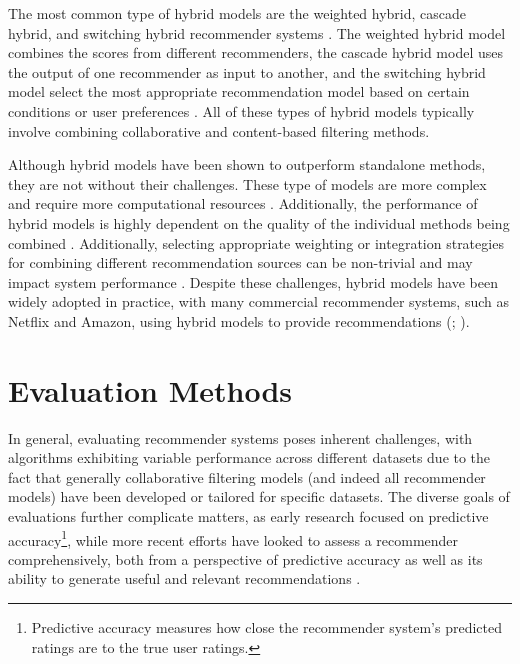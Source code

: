 The most common type of hybrid models are the weighted hybrid, cascade hybrid, and switching hybrid recommender systems \cite{ccano2017hybrid}. The weighted hybrid model combines the scores from different recommenders, the cascade hybrid model uses the output of one recommender as input to another, and the switching hybrid model select the most appropriate recommendation model based on certain conditions or user preferences \cite{ccano2017hybrid}. All of these types of hybrid models typically involve combining collaborative and content-based filtering methods. 

Although hybrid models have been shown to outperform standalone methods, they are not without their challenges. These type of models are more complex and require more computational resources \cite{ccano2017hybrid}. Additionally, the performance of hybrid models is highly dependent on the quality of the individual methods being combined \cite{ccano2017hybrid}. Additionally, selecting appropriate weighting or integration strategies for combining different recommendation sources can be non-trivial and may impact system performance \cite{thorat2015survey}. Despite these challenges, hybrid models have been widely adopted in practice, with many commercial recommender systems, such as Netflix and Amazon, using hybrid models to provide recommendations (\cite{ccano2017hybrid}; \cite{thorat2015survey}).

\section{Evaluation Methods}
\label{sec:2 Evaluation Methods}

In general, evaluating recommender systems poses inherent challenges, with algorithms exhibiting variable performance across different datasets \cite{herlocker2004evaluating} due to the fact that generally collaborative filtering models (and indeed all recommender models) have been developed or tailored for specific datasets. The diverse goals of evaluations further complicate matters, as early research focused on predictive accuracy\footnote{Predictive accuracy measures how close the recommender system’s predicted ratings are to the true user ratings.}, while more recent efforts have looked to assess a recommender comprehensively, both from a perspective of predictive accuracy as well as its ability to generate useful and relevant recommendations \cite{zangerle2022evaluating}. 

